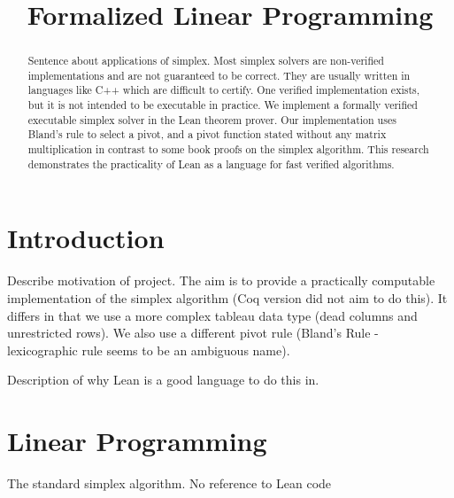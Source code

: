 \documentclass[11pt]{article} %
\title{Formalized Linear Programming}
\date{}
\begin{document}

\lstset{language=lean}
\lstset{basicstyle=\normalsize}
\maketitle
\begin{abstract}
  Sentence about applications of simplex. Most simplex solvers are non-verified implementations and are not guaranteed to be correct. They are usually written in languages like C++ which are difficult to certify. One verified implementation exists, but it is not intended to be executable in practice. We implement a formally verified executable simplex solver in the Lean theorem prover. Our implementation uses Bland's rule to select a pivot, and a pivot function stated without any matrix multiplication in contrast to some book proofs on the simplex algorithm. This research demonstrates the practicality of Lean as a language for fast verified algorithms.
\end{abstract}

\section{Introduction}
\color{red}Describe motivation of project.
The aim is to provide a practically computable implementation of the simplex algorithm (Coq version did not aim to do this). It differs in that we use a more complex tableau data type (dead columns and unrestricted rows). We also use a different pivot rule (Bland's Rule - lexicographic rule seems to be an ambiguous name).

Description of why Lean is a good language to do this in.\color{black}

\section{Linear Programming}
\color{red} The standard simplex algorithm. No reference to Lean code \color{black}
\end{document}
